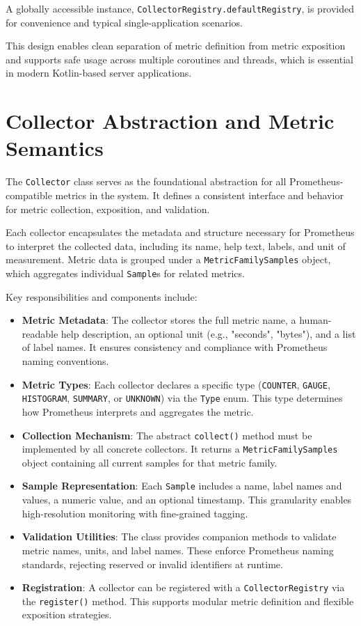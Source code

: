 A globally accessible instance, \texttt{CollectorRegistry.defaultRegistry}, is provided for convenience and typical single-application scenarios.

This design enables clean separation of metric definition from metric exposition and supports safe usage across multiple coroutines and threads, which is essential in modern Kotlin-based server applications.

\section{Collector Abstraction and Metric Semantics}

The \texttt{Collector} class serves as the foundational abstraction for all Prometheus-compatible metrics in the system. It defines a consistent interface and behavior for metric collection, exposition, and validation.

Each collector encapsulates the metadata and structure necessary for Prometheus to interpret the collected data, including its name, help text, labels, and unit of measurement. Metric data is grouped under a \texttt{MetricFamilySamples} object, which aggregates individual \texttt{Sample}s for related metrics.

Key responsibilities and components include:
\begin{itemize}
    \item \textbf{Metric Metadata}: The collector stores the full metric name, a human-readable help description, an optional unit (e.g., "seconds", "bytes"), and a list of label names. It ensures consistency and compliance with Prometheus naming conventions.
    
    \item \textbf{Metric Types}: Each collector declares a specific type (\texttt{COUNTER}, \texttt{GAUGE}, \texttt{HISTOGRAM}, \texttt{SUMMARY}, or \texttt{UNKNOWN}) via the \texttt{Type} enum. This type determines how Prometheus interprets and aggregates the metric.

    \item \textbf{Collection Mechanism}: The abstract \texttt{collect()} method must be implemented by all concrete collectors. It returns a \texttt{MetricFamilySamples} object containing all current samples for that metric family.
    
    \item \textbf{Sample Representation}: Each \texttt{Sample} includes a name, label names and values, a numeric value, and an optional timestamp. This granularity enables high-resolution monitoring with fine-grained tagging.

    \item \textbf{Validation Utilities}: The class provides companion methods to validate metric names, units, and label names. These enforce Prometheus naming standards, rejecting reserved or invalid identifiers at runtime.
    
    \item \textbf{Registration}: A collector can be registered with a \texttt{CollectorRegistry} via the \texttt{register()} method. This supports modular metric definition and flexible exposition strategies.
\end{itemize}


